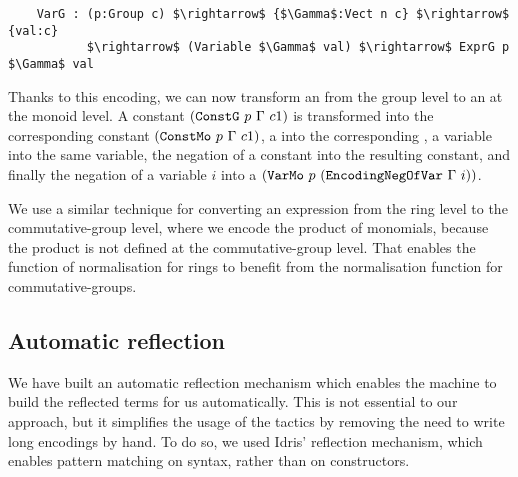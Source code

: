 \begin{lstlisting}
    VarG : (p:Group c) $\rightarrow$ {$\Gamma$:Vect n c} $\rightarrow$ {val:c} 
           $\rightarrow$ (Variable $\Gamma$ val) $\rightarrow$ ExprG p $\Gamma$ val
\end{lstlisting}


Thanks to this encoding, we can now transform an  from the group
level to an  at the monoid level. A constant $({\mbox{\texttt{ConstG}}}\ p\
\Gamma\ c1)$ is transformed into the corresponding constant
$({\mbox{\texttt{ConstMo}}}\ p\ \Gamma\ c1)$, a  into the corresponding
\code{PlusMo}, a variable into the same variable, the negation of a
constant into the resulting constant, and finally the negation of a variable
$i$ into a $(\code{VarMo}\ p\ (\code{EncodingNegOfVar}\ \Gamma\ i))$.

We use a similar technique for converting an expression from the ring level
to the commutative-group level, where we encode the product of monomials,
because the product is not defined at the commutative-group level.
That enables the function of normalisation for rings to benefit from the
normalisation function for commutative-groups.


\subsection{Automatic reflection}
		
We have built an automatic reflection mechanism which enables the machine to
build the reflected terms for us automatically. This is not essential to our
approach, but it simplifies the usage of the tactics by removing the need to
write long encodings by hand.  To do so, we used Idris' reflection mechanism,
which enables pattern matching on syntax, rather than on constructors. 



